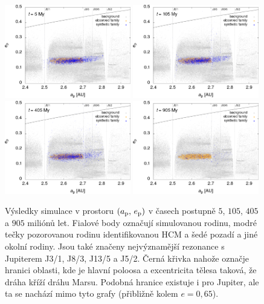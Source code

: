 \documentclass[A4paper, 12pt, oneside]{book}
\begin{document}
\immediate{}
\immediate{}
\immediate{}
\immediate{}
\begin{figure}
	\centering
	\includegraphics[width=0.49\textwidth]{obr/ae_5t.png}
	\includegraphics[width=0.49\textwidth]{obr/ae_105t.png}\\
	\includegraphics[width=0.49\textwidth]{obr/ae_405t.png}
	\includegraphics[width=0.49\textwidth]{obr/ae_905t.png}
	\caption{Výsledky simulace v prostoru $(a_{\rm p},\,e_{\rm p})$ v časech postupně $5$, $105$, $405$ a $905$ miliónů let. Fialové body označují simulovanou rodinu, modré tečky pozorovanou rodinu identifikovanou HCM a šedé pozadí a jiné okolní rodiny. Jsou také značeny nejvýznamější rezonance s Jupiterem J3/1, J8/3, J13/5 a J5/2. Černá křivka nahože označje hranici oblasti, kde je hlavní poloosa a excentricita tělesa taková, že dráha kříží dráhu Marsu. Podobná hranice existuje i pro Jupiter, ale ta se nachází mimo tyto grafy (přibližně kolem $e=0,65$). } \label{fig_ae_sim}
\end{figure}	
\end{document}
